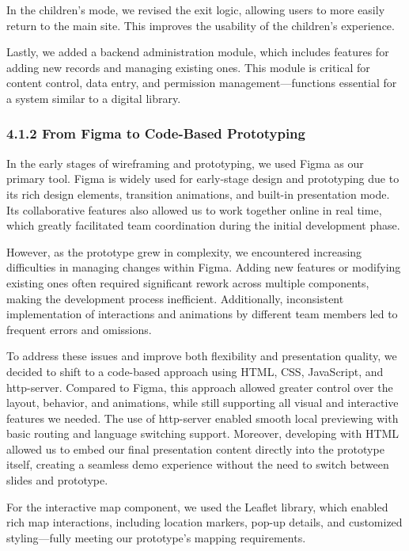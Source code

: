 In the children’s mode, we revised the exit logic, allowing users to more easily return to the main site. This improves the usability of the children’s experience.

Lastly, we added a backend administration module, which includes features for adding new records and managing existing ones. This module is critical for content control, data entry, and permission management—functions essential for a system similar to a digital library.

\subsubsection*{4.1.2 From Figma to Code-Based Prototyping}

In the early stages of wireframing and prototyping, we used Figma as our primary tool. Figma is widely used for early-stage design and prototyping due to its rich design elements, transition animations, and built-in presentation mode. Its collaborative features also allowed us to work together online in real time, which greatly facilitated team coordination during the initial development phase.

However, as the prototype grew in complexity, we encountered increasing difficulties in managing changes within Figma. Adding new features or modifying existing ones often required significant rework across multiple components, making the development process inefficient. Additionally, inconsistent implementation of interactions and animations by different team members led to frequent errors and omissions.

To address these issues and improve both flexibility and presentation quality, we decided to shift to a code-based approach using HTML, CSS, JavaScript, and http-server. Compared to Figma, this approach allowed greater control over the layout, behavior, and animations, while still supporting all visual and interactive features we needed. The use of http-server enabled smooth local previewing with basic routing and language switching support. Moreover, developing with HTML allowed us to embed our final presentation content directly into the prototype itself, creating a seamless demo experience without the need to switch between slides and prototype.

For the interactive map component, we used the Leaflet library, which enabled rich map interactions, including location markers, pop-up details, and customized styling—fully meeting our prototype’s mapping requirements.

